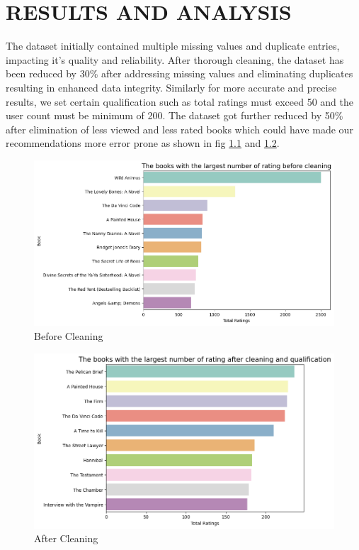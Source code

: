 \chapter{RESULTS AND ANALYSIS}
The dataset initially contained multiple missing values and duplicate entries, impacting it's quality and reliability.
     After thorough cleaning, the dataset has been reduced by 30\% after addressing missing values and eliminating duplicates resulting in enhanced data integrity. Similarly for more accurate and precise results, we set certain qualification such as total ratings must exceed 50 and the user count must be minimum of 200. The dataset got further reduced by 50\% after elimination of less viewed and  less rated books which could have made our recommendations more error prone as shown in fig \ref{Before Cleaning} and \ref{After Cleaning}.
    \begin{figure}[h]
        \centering
        \includegraphics[width=1\linewidth]{img/Graphics/before_cleaning.png}
        \caption{Before Cleaning}
        \label{Before Cleaning}
    \end{figure}

    \begin{figure}[h]
        \centering
        \includegraphics[width=1\linewidth]{img/Graphics/after-cleaning.png}
        \caption{After Cleaning}
        \label{After Cleaning}
    \end{figure}

